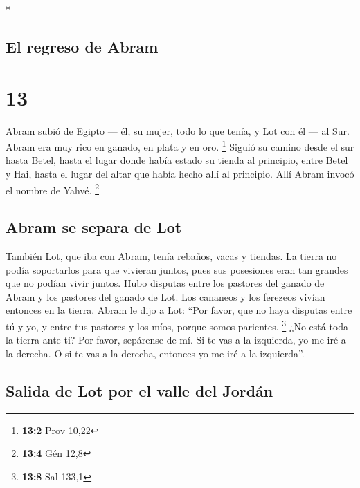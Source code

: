 \begin{paracol}{2}
\begin{otherlanguage}{english}
\end{otherlanguage}

\switchcolumn[0]*

\hypertarget{el-regreso-de-abram}{%
\subsection{El regreso de Abram}\label{el-regreso-de-abram}}

\hypertarget{section-24}{%
\section{13}\label{section-24}}

 Abram subió de Egipto --- él, su mujer, todo lo que
tenía, y Lot con él --- al Sur.  Abram era muy rico en
ganado, en plata y en oro. \footnote{\textbf{13:2} Prov 10,22}
 Siguió su camino desde el sur hasta Betel, hasta el lugar
donde había estado su tienda al principio, entre Betel y Hai,
 hasta el lugar del altar que había hecho allí al
principio. Allí Abram invocó el nombre de Yahvé. \footnote{\textbf{13:4}
  Gén 12,8}

\hypertarget{abram-se-separa-de-lot}{%
\subsection{Abram se separa de Lot}\label{abram-se-separa-de-lot}}

 También Lot, que iba con Abram, tenía rebaños, vacas y
tiendas.  La tierra no podía soportarlos para que vivieran
juntos, pues sus posesiones eran tan grandes que no podían vivir juntos.
 Hubo disputas entre los pastores del ganado de Abram y
los pastores del ganado de Lot. Los cananeos y los ferezeos vivían
entonces en la tierra.  Abram le dijo a Lot: ``Por favor,
que no haya disputas entre tú y yo, y entre tus pastores y los míos,
porque somos parientes. \footnote{\textbf{13:8} Sal 133,1}
 ¿No está toda la tierra ante ti? Por favor, sepárense de
mí. Si te vas a la izquierda, yo me iré a la derecha. O si te vas a la
derecha, entonces yo me iré a la izquierda''.

\hypertarget{salida-de-lot-por-el-valle-del-jorduxe1n}{%
\subsection{Salida de Lot por el valle del
Jordán}\label{salida-de-lot-por-el-valle-del-jorduxe1n}}


\end{paracol}
